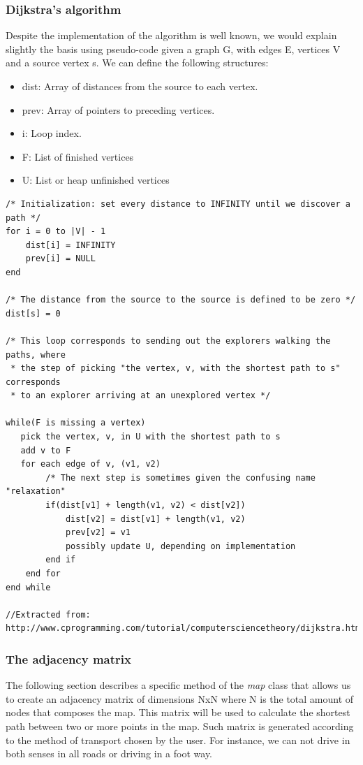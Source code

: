\documentclass{article}
\begin{document}
\subsubsection{Dijkstra's algorithm}
Despite the implementation of the algorithm is well known, we would explain slightly the basis using pseudo-code given a graph G, with edges E, vertices V and a source vertex s. We can define the following structures:

\begin{itemize}
  \item dist: Array of distances from the source to each vertex.
  \item prev: Array of pointers to preceding vertices.
  \item i: Loop index.
  \item F: List of finished vertices
  \item U: List or heap unfinished vertices
\end{itemize}


\begin{lstlisting}
/* Initialization: set every distance to INFINITY until we discover a path */
for i = 0 to |V| - 1
    dist[i] = INFINITY
    prev[i] = NULL
end

/* The distance from the source to the source is defined to be zero */
dist[s] = 0

/* This loop corresponds to sending out the explorers walking the paths, where
 * the step of picking "the vertex, v, with the shortest path to s" corresponds
 * to an explorer arriving at an unexplored vertex */

while(F is missing a vertex)
   pick the vertex, v, in U with the shortest path to s
   add v to F
   for each edge of v, (v1, v2)
        /* The next step is sometimes given the confusing name "relaxation"
        if(dist[v1] + length(v1, v2) < dist[v2])
            dist[v2] = dist[v1] + length(v1, v2)
            prev[v2] = v1
            possibly update U, depending on implementation
        end if
    end for
end while

//Extracted from: http://www.cprogramming.com/tutorial/computersciencetheory/dijkstra.html
\end{lstlisting}

\subsubsection{The adjacency matrix}
The following section describes a specific method of the \textit{map} class that allows us to create an adjacency matrix of dimensions NxN where N is the total amount of nodes that composes the map. This matrix will be used to calculate the shortest path between two or more points in the map. Such matrix is generated according to the method of transport chosen by the user. For instance, we can not drive in both senses in all roads or driving in a foot way.
\end{document}
